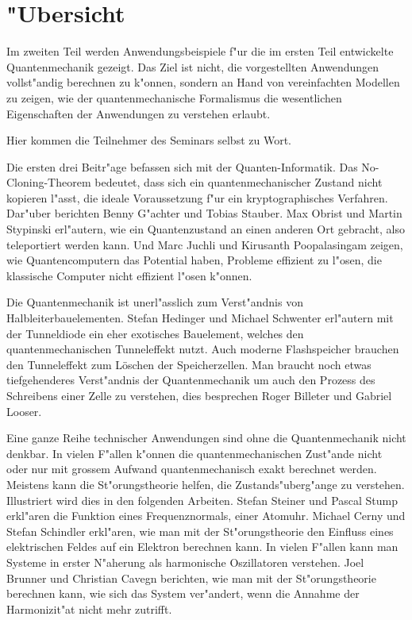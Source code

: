\chapter*{"Ubersicht}
\rhead{}
Im zweiten Teil werden Anwendungsbeispiele f"ur die im ersten
Teil entwickelte Quantenmechanik gezeigt.
Das Ziel ist nicht, die vorgestellten Anwendungen vollst"andig
berechnen zu k"onnen, sondern an Hand von vereinfachten Modellen
zu zeigen, wie der quantenmechanische Formalismus die wesentlichen
Eigenschaften der Anwendungen zu verstehen erlaubt.

Hier kommen die Teilnehmer des Seminars selbst zu Wort.

Die ersten drei Beitr"age befassen sich mit der Quanten-Informatik.
Das No-Cloning-Theorem bedeutet, dass sich ein quantenmechanischer
Zustand nicht kopieren l"asst, die ideale Voraussetzung f"ur ein
kryptographisches Verfahren.
Dar"uber berichten Benny G"achter und Tobias Stauber.
Max Obrist und Martin Stypinski erl"autern, wie ein Quantenzustand
an einen anderen Ort gebracht, also teleportiert werden kann.
Und Marc Juchli und Kirusanth Poopalasingam zeigen, wie Quantencomputern
das Potential haben, Probleme effizient zu l"osen, die klassische 
Computer nicht effizient l"osen k"onnen.

Die Quantenmechanik ist unerl"asslich zum Verst"andnis von
Halbleiterbauelementen.
Stefan Hedinger und Michael Schwenter erl"autern mit der Tunneldiode
ein eher exotisches Bauelement, welches den quantenmechanischen
Tunneleffekt nutzt.
Auch moderne Flashspeicher brauchen den Tunneleffekt zum Löschen 
der Speicherzellen.
Man braucht noch etwas tiefgehenderes Verst"andnis der Quantenmechanik
um auch den Prozess des Schreibens einer Zelle zu verstehen, dies
besprechen Roger Billeter und Gabriel Looser.

Eine ganze Reihe technischer Anwendungen sind ohne die Quantenmechanik
nicht denkbar.
In vielen F"allen k"onnen die quantenmechanischen Zust"ande nicht oder nur
mit grossem Aufwand quantenmechanisch exakt berechnet werden.
Meistens kann die St"orungstheorie helfen, die Zustands"uberg"ange
zu verstehen.
Illustriert wird dies in den folgenden Arbeiten.
Stefan Steiner und Pascal Stump erkl"aren die Funktion eines
Frequenznormals, einer Atomuhr. 
Michael Cerny und Stefan Schindler erkl"aren, wie man mit der
St"orungstheorie den Einfluss eines elektrischen Feldes auf ein
Elektron berechnen kann.
In vielen F"allen kann man Systeme in erster N"aherung als harmonische
Oszillatoren verstehen. Joel Brunner und Christian Cavegn berichten,
wie man mit der St"orungstheorie berechnen kann, wie sich das System
ver"andert, wenn die Annahme der Harmonizit"at nicht mehr zutrifft.

